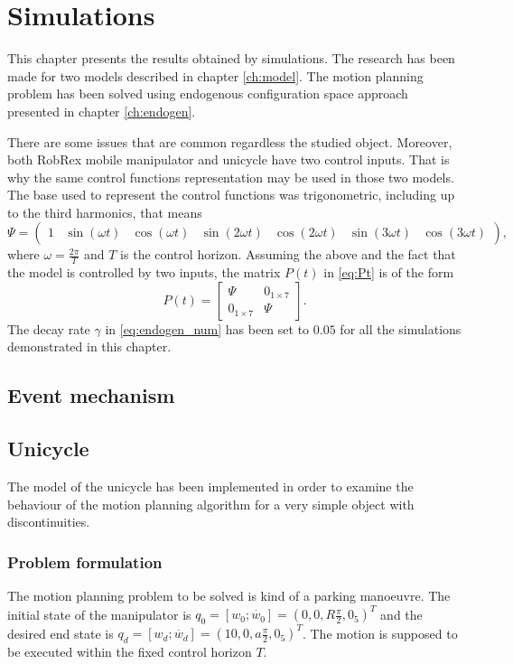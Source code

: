 \chapter{Simulations}
This chapter presents the results obtained by simulations. The research has been made for two models
described in chapter \ref{ch:model}. The motion planning problem has been solved using endogenous
configuration space approach presented in chapter \ref{ch:endogen}.

There are some issues that are common regardless the studied object. Moreover,
both RobRex mobile manipulator and unicycle have two control inputs. That is why
the same control functions representation may be used in those two models.
The base used to represent the control functions was trigonometric, including up to the third harmonics, that means
\begin{equation}
\Psi=\begin{pmatrix}
1 & \sin(\omega t) & \cos(\omega t)& \sin(2\omega t) & \cos(2\omega t)& \sin(3\omega t) & \cos(3\omega t)
\end{pmatrix},
\end{equation}
where $\omega=\frac{2\pi}{T}$ and $T$ is the control horizon. Assuming the above and the fact that the model is controlled by two inputs, the matrix $P(t)$ in \eqref{eq:Pt} is of the form
\begin{equation}
P(t)=\begin{bmatrix}
\Psi & 0_{1\times 7}\\
0_{1\times 7} & \Psi
\end{bmatrix}.
\end{equation}
The decay rate $\gamma$ in \eqref{eq:endogen_num} has been set to $0.05$ for all
the simulations demonstrated in this chapter.

\section{Event mechanism}


\section{Unicycle}
The model of the unicycle has been implemented in order to examine the behaviour
of the motion planning algorithm for a very simple object with discontinuities. 

\subsection{Problem formulation}
The motion planning problem to be solved is kind of a parking manoeuvre. The initial
state of the manipulator is $q_0 = [w_0; \dot{w_0}] = (0, 0, R\frac{\pi}{2}, 0_5)^T$
and the desired end state is $q_d = [w_d; \dot{w_d}] = (10, 0, a\frac{\pi}{2}, 0_5)^T$.
The motion is supposed to be executed within the fixed control horizon $T$.

